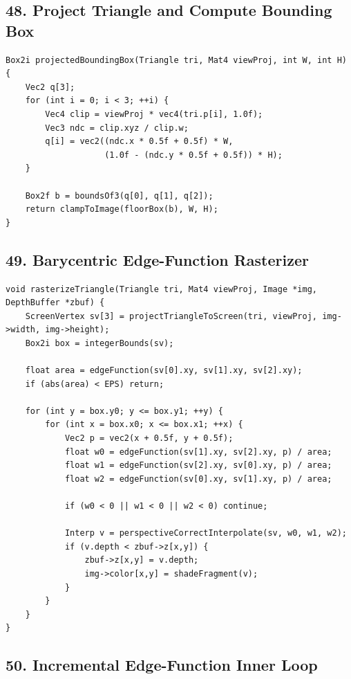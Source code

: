 \documentclass[10pt,letterpaper]{article}
\begin{document}
\subsection{48. Project Triangle and Compute Bounding Box}

\begin{verbatim}
Box2i projectedBoundingBox(Triangle tri, Mat4 viewProj, int W, int H) {
    Vec2 q[3];
    for (int i = 0; i < 3; ++i) {
        Vec4 clip = viewProj * vec4(tri.p[i], 1.0f);
        Vec3 ndc = clip.xyz / clip.w;
        q[i] = vec2((ndc.x * 0.5f + 0.5f) * W,
                    (1.0f - (ndc.y * 0.5f + 0.5f)) * H);
    }

    Box2f b = boundsOf3(q[0], q[1], q[2]);
    return clampToImage(floorBox(b), W, H);
}
\end{verbatim}

\subsection{49. Barycentric Edge-Function Rasterizer}

\begin{verbatim}
void rasterizeTriangle(Triangle tri, Mat4 viewProj, Image *img, DepthBuffer *zbuf) {
    ScreenVertex sv[3] = projectTriangleToScreen(tri, viewProj, img->width, img->height);
    Box2i box = integerBounds(sv);

    float area = edgeFunction(sv[0].xy, sv[1].xy, sv[2].xy);
    if (abs(area) < EPS) return;

    for (int y = box.y0; y <= box.y1; ++y) {
        for (int x = box.x0; x <= box.x1; ++x) {
            Vec2 p = vec2(x + 0.5f, y + 0.5f);
            float w0 = edgeFunction(sv[1].xy, sv[2].xy, p) / area;
            float w1 = edgeFunction(sv[2].xy, sv[0].xy, p) / area;
            float w2 = edgeFunction(sv[0].xy, sv[1].xy, p) / area;

            if (w0 < 0 || w1 < 0 || w2 < 0) continue;

            Interp v = perspectiveCorrectInterpolate(sv, w0, w1, w2);
            if (v.depth < zbuf->z[x,y]) {
                zbuf->z[x,y] = v.depth;
                img->color[x,y] = shadeFragment(v);
            }
        }
    }
}
\end{verbatim}

\subsection{50. Incremental Edge-Function Inner Loop}
\end{document}
